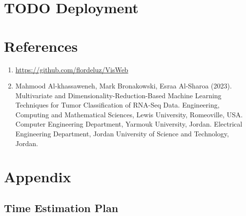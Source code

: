 \documentclass[a4paper]{article}
\begin{document}
\section{{\bfseries\sffamily TODO} Deployment}
\label{sec:org12cf92a}

\section{References}
\label{sec:orgc2caa80}

\begin{enumerate}
\item \url{https://github.com/flordeluz/VisWeb}
\item Mahmood Al-khassaweneh, Mark Bronakowski, Esraa Al-Sharoa (2023). Multivariate and Dimensionality-Reduction-Based Machine Learning Techniques for Tumor Classification of RNA-Seq Data. Engineering, Computing and Mathematical Sciences, Lewis University, Romeoville, USA. Computer Engineering Department, Yarmouk University, Jordan. Electrical Engineering Department, Jordan University of Science and Technology, Jordan.
\end{enumerate}

\clearpage
\section{Appendix}
\label{sec:org6b6d1ed}

\subsection{Time Estimation Plan}
\label{sec:org88f5dfa}
\end{document}
